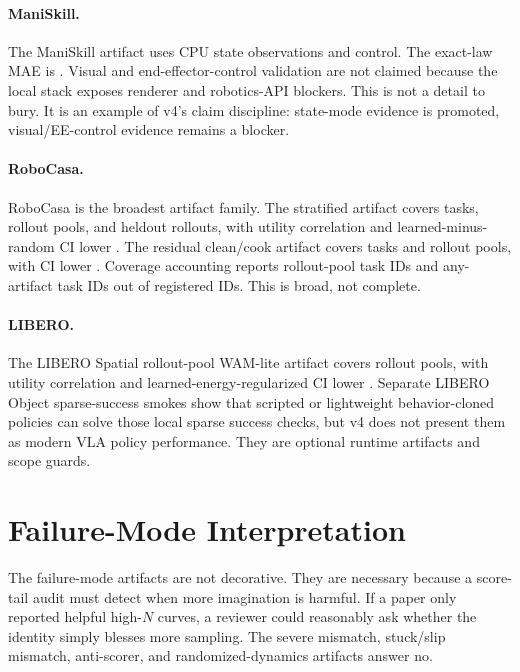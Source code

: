 \paragraph{ManiSkill.}
The ManiSkill artifact uses CPU state observations and
 control. The exact-law MAE is
\VFourWAMManiSkillExactMAE{}. Visual and end-effector-control validation are
not claimed because the local stack exposes renderer and robotics-API blockers.
This is not a detail to bury. It is an example of v4's claim discipline:
state-mode evidence is promoted, visual/EE-control evidence remains a blocker.

\paragraph{RoboCasa.}
RoboCasa is the broadest artifact family. The stratified artifact covers
\VFourWAMRoboCasaTasks{} tasks, \VFourWAMRoboCasaPools{} rollout pools, and
\VFourWAMRoboCasaEvalSamples{} heldout rollouts, with utility correlation
\VFourWAMRoboCasaCorr{} and learned-minus-random CI lower
\VFourWAMRoboCasaCILo{}. The residual clean/cook artifact covers
\VFourWAMRoboCasaResidualTasks{} tasks and \VFourWAMRoboCasaResidualPools{}
rollout pools, with CI lower \VFourWAMRoboCasaResidualCILo{}. Coverage
accounting reports \VFourWAMRoboCasaRolloutTaskIDs{} rollout-pool task IDs and
\VFourWAMRoboCasaAnyTaskIDs{} any-artifact task IDs out of
\VFourWAMRoboCasaRegistered{} registered IDs. This is broad, not complete.

\paragraph{LIBERO.}
The LIBERO Spatial rollout-pool WAM-lite artifact covers
\VFourWAMLiberoPools{} rollout pools, with utility correlation
\VFourWAMLiberoCorr{} and learned-energy-regularized CI lower
\VFourWAMLiberoCILo{}. Separate LIBERO Object sparse-success smokes show that
scripted or lightweight behavior-cloned policies can solve those local sparse
success checks, but v4 does not present them as modern VLA policy performance.
They are optional runtime artifacts and scope guards.

\section{Failure-Mode Interpretation}
\label{app:failure-interpretation}

The failure-mode artifacts are not decorative. They are necessary because a
score-tail audit must detect when more imagination is harmful. If a paper only
reported helpful high-$N$ curves, a reviewer could reasonably ask whether the
identity simply blesses more sampling. The severe mismatch, stuck/slip
mismatch, anti-scorer, and randomized-dynamics artifacts answer no.

